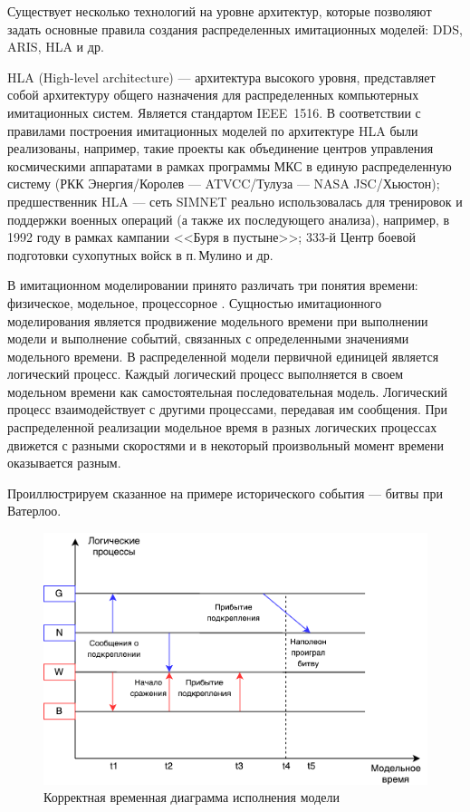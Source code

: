 Существует несколько технологий на уровне архитектур, которые позволяют задать основные правила создания распределенных имитационных моделей: DDS, ARIS, HLA и др.

HLA (High-level architecture) --- архитектура высокого уровня, представляет собой архитектуру общего назначения для распределенных компьютерных имитационных систем. Является стандартом IEEE~1516.
В соответствии с правилами построения имитационных моделей по архитектуре HLA были реализованы, например, такие проекты как объединение центров управления космическими аппаратами в рамках программы МКС в единую распределенную систему (РКК Энергия/Королев --- ATVCC/Тулуза --- NASA JSC/Хьюстон); предшественник HLA --- сеть SIMNET реально использовалась для тренировок и поддержки военных операций (а также их последующего анализа), например, в 1992 году в рамках кампании <<Буря в пустыне>>; 333-й Центр боевой подготовки сухопутных войск в п.\,Мулино и др.

В имитационном моделировании принято различать три понятия времени: физическое, модельное, процессорное \cite{okol}. Сущностью имитационного моделирования является продвижение модельного времени при выполнении модели и выполнение событий, связанных с определенными значениями модельного времени. В распределенной модели первичной единицей является логический процесс. Каждый логический процесс выполняется в своем модельном времени как самостоятельная последовательная модель. Логический процесс взаимодействует с другими процессами, передавая им сообщения. При распределенной реализации модельное время в разных логических процессах движется с разными скоростями и в некоторый произвольный момент времени оказывается разным.

Проиллюстрируем сказанное на примере исторического события --- битвы при Ватерлоо.

\begin{figure}[H]
\centering
\includegraphics[scale=1]{графика/waterloo.pdf}
\caption{Корректная временная диаграмма исполнения модели}
\end{figure}

